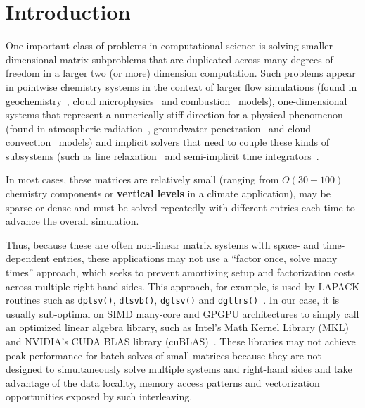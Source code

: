 \documentclass[10pt, conference, compsocconf]{IEEEtran}
\begin{document}
\section{Introduction}
\label{sec:intro}

One important class of problems in computational science is solving
  smaller-dimensional matrix subproblems that are duplicated across
  many degrees of freedom in a larger two (or more) dimension computation.
Such problems appear in
  pointwise chemistry systems in the context of larger 
    flow simulations (found in geochemistry~\cite{pflotran}, cloud
    microphysics~\cite{climate_mg2} and combustion~\cite{combustion_pazner}
    models),
  one-dimensional systems that represent a numerically stiff
    direction for a physical phenomenon (found in atmospheric
    radiation~\cite{climate_rrtmg}, groundwater
    penetration~\cite{pflotran_groundwater} and cloud
    convection~\cite{climate_sam} models) and
  implicit solvers that need to couple these kinds of subsystems
    (such as line relaxation~\cite{multigrid_trottenberg} and 
    semi-implicit time integrators~\cite{imex}.

In most cases, these matrices are relatively small 
  (ranging from \(O(30-100)\) chemistry components or \textbf{vertical levels}
  in a climate application), may be sparse or dense and must be solved
  repeatedly with different entries each time to advance the overall simulation.

Thus, because these are often non-linear matrix systems with space- and 
  time-dependent entries, these applications may not use a 
  ``factor once, solve many times'' approach, which seeks to prevent amortizing
  setup and factorization costs across multiple right-hand sides.
This approach, for example, is used by 
  LAPACK routines such as \lstinline{dptsv()}, \lstinline{dtsvb()},
  \lstinline{dgtsv()} and
  \lstinline{dgttrs()}~\cite{mkl_ref_driver_routines}.
In our case, it is usually sub-optimal on SIMD many-core and GPGPU
  architectures to simply call an optimized linear algebra library, 
  such as Intel's Math Kernel Library (MKL)~\cite{mkl} and NVIDIA's
  CUDA BLAS library (cuBLAS)~\cite{cublas}.
These libraries may not achieve peak performance for batch solves of small
  matrices because they are not designed to simultaneously solve multiple systems
  and right-hand sides and take advantage of the data locality, memory
  access patterns and vectorization opportunities exposed by such interleaving. 
  
\end{document}
